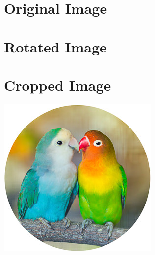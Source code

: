 \documentclass{article}
\begin{document}
    \setlength{\fboxsep}{15pt}
    \section{Original Image}

    \setlength{\fboxrule}{4pt}
    \section{Rotated Image}

    \section{Cropped Image}
    \includegraphics[clip=true, trim = 5mm 5mm 5mm 5mm]{parrot.jpeg}
\end{document}
